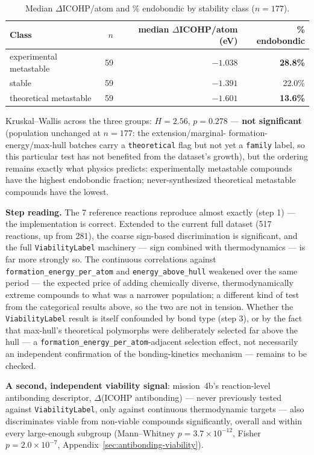 \documentclass[11pt,a4paper]{article}
\begin{document}
\begin{table}[htbp]
\centering
\caption{Median $\Delta$ICOHP/atom and \% endobondic by stability class ($n=177$).}
\label{tab:family-breakdown}
\begin{tabular}{@{}lrrr@{}}
\toprule
Class & $n$ & median $\Delta$ICOHP/atom (eV) & \% endobondic \\
\midrule
experimental metastable & 59 & $-1.038$ & \textbf{28.8\%} \\
stable & 59 & $-1.391$ & 22.0\% \\
theoretical metastable & 59 & $-1.601$ & \textbf{13.6\%} \\
\bottomrule
\end{tabular}
\end{table}

Kruskal--Wallis across the three groups: $H=2.56$, $p=0.278$ --- \textbf{not
significant} (population unchanged at $n=177$: the extension/marginal-
formation-energy/max-hull batches carry a \texttt{theoretical} flag but
not yet a \texttt{family} label, so this particular test has not
benefited from the dataset's growth), but the ordering remains exactly
what physics predicts: experimentally metastable compounds have the
highest endobondic fraction; never-synthesized theoretical metastable
compounds have the lowest.

\textbf{Step reading.} The 7 reference reactions reproduce almost
exactly (step 1) --- the implementation is correct. Extended to the
current full dataset (517 reactions, up from 281), the coarse sign-based
discrimination is significant, and the full \texttt{ViabilityLabel}
machinery --- sign combined with thermodynamics --- is far more strongly
so. The continuous correlations against \texttt{formation\_energy\_per\_atom}
and \texttt{energy\_above\_hull} weakened over the same period --- the
expected price of adding chemically diverse, thermodynamically extreme
compounds to what was a narrower population; a different kind of test
from the categorical results above, so the two are not in tension.
Whether the \texttt{ViabilityLabel} result is itself confounded by bond
type (step 3), or by the fact that max-hull's theoretical polymorphs
were deliberately selected far above the hull --- a
\texttt{formation\_energy\_per\_atom}-adjacent selection effect, not
necessarily an independent confirmation of the bonding-kinetics
mechanism --- remains to be checked.

\textbf{A second, independent viability signal}: mission~4b's reaction-level
antibonding descriptor, $\Delta$(ICOHP antibonding) --- never previously
tested against \texttt{ViabilityLabel}, only against continuous
thermodynamic targets --- also discriminates viable from non-viable
compounds significantly, overall and within every large-enough subgroup
(Mann--Whitney $p=3.7\times10^{-12}$, Fisher $p=2.0\times10^{-7}$,
Appendix~\ref{sec:antibonding-viability}).
\end{document}
